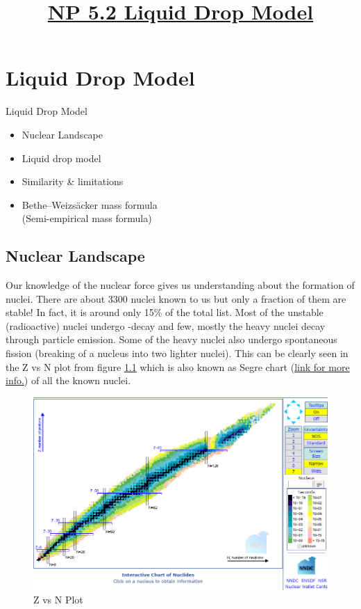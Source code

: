\documentclass[ebook,12pt,oneside,openany]{memoir}
\title{\underline{\textbf{NP 5.2} Liquid Drop Model}}
\author{}
\date{}
\begin{document}
\tableofcontents
\listoffigures
\listoftables

\maketitle


\chapter{Liquid Drop Model} 
 
     \begin{tcolorbox} [title = \textbf{Key Objectives:}, width = \textwidth]
    Liquid Drop Model
    \begin{itemize}
        \item Nuclear Landscape
        \item Liquid drop model
        \item Similarity \& limitations
        \item Bethe–Weizsäcker mass formula \\ (Semi-empirical mass formula) 
    \end{itemize}
    \end{tcolorbox}
 
    \section{Nuclear Landscape}
    Our knowledge of the nuclear force gives us understanding about the formation of nuclei. There are about 3300 nuclei known to us but only a fraction of them are stable! In fact, it is around only 15\% of the total list. Most of the unstable (radioactive) nuclei undergo -decay and few, mostly the heavy nuclei decay through  particle emission. Some of the heavy nuclei also undergo spontaneous fission (breaking of a nucleus into two lighter nuclei). This can be clearly seen in the Z vs N plot from figure \ref{fig:plot_ZvsN} which is also known as Segre chart (\href{https://www.nndc.bnl.gov/nudat2/}{link for more info.}) of all the known nuclei.
    
        \begin{figure}
            \centering
            \includegraphics[width = \textwidth]{images/ZvN_plot.png}
            \caption{Z vs N Plot}
            \label{fig:plot_ZvsN}
        \end{figure}
    
\end{document}
